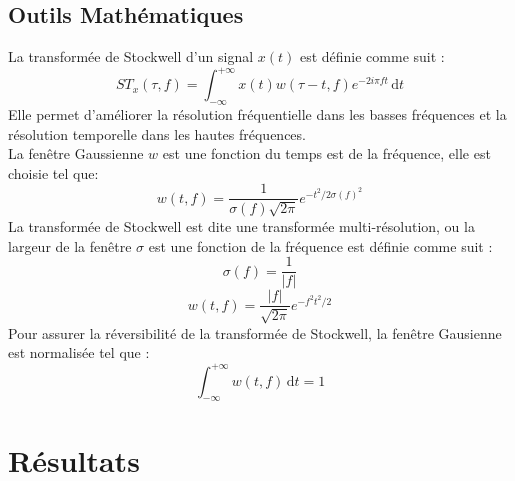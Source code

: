 \documentclass[a0,portrait]{a0poster}
\begin{document}
\begin{multicols}{2}

\subsection*{Outils Mathématiques}

La transformée de Stockwell \cite{stockwell1996localization}
 d'un signal $x(t)$ est définie comme suit :
\begin{equation*}
	ST_{x}(\tau,f) = \int_{-\infty}^{+\infty} x(t) w(\tau-t,f) e^{-2\textit{i}\pi ft} \, \mathrm{d}t
	\label{eq.3}
\end{equation*}
Elle permet d'améliorer la résolution fréquentielle dans les basses fréquences et la résolution temporelle dans les hautes fréquences.\\
La fenêtre Gaussienne $w$ est une fonction du temps est de la fréquence, elle est choisie tel que:
\begin{equation*}
	w(t, f) = \frac{1}{\sigma(f) \sqrt{2 \pi}} e^{{-t^2}/{2\sigma(f)^2}}
	\label{eq.4}
\end{equation*}
La transformée de Stockwell est dite une transformée multi-résolution, ou la largeur de la fenêtre $\sigma$ est une fonction de la fréquence est définie comme suit :
\begin{equation*}
	\sigma(f) = \frac{1}{|f|}
	\label{eq.5}
\end{equation*}
\begin{equation*}
	w(t,f) = \frac{|f|}{\sqrt{2 \pi}} e^{{-f^{2}t^{2}}/{2}}
	\label{eq.6}
\end{equation*}
Pour assurer la réversibilité de la transformée de Stockwell, la fenêtre Gausienne est normalisée tel que :
\begin{equation*}
	\int_{-\infty}^{+\infty} w(t,f) \, \mathrm{d}t = 1
	\label{eq.7}
\end{equation*}


\section*{Résultats}




\end{multicols}
\end{document}
